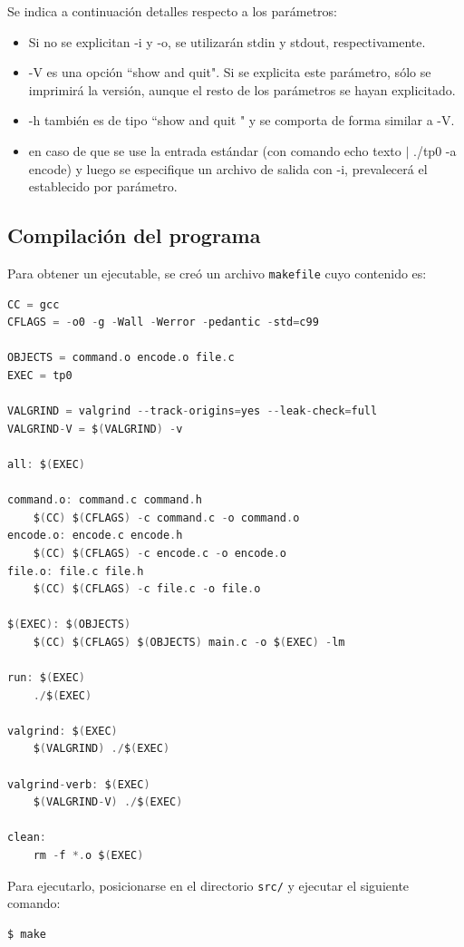 \documentclass[10pt,a4paper]{article}
\begin{document}
Se indica a continuación detalles respecto a los parámetros:

\begin{itemize}
    \item Si no se explicitan -i y -o, se utilizarán stdin y stdout, respectivamente. 
    \item -V es una opción ``show and quit". Si se explicita este parámetro, sólo se imprimirá la versión, aunque el resto de los parámetros se hayan explicitado. 
    \item -h también es de tipo ``show and quit " y se comporta de forma similar a -V.
    \item en caso de que se use la entrada estándar (con comando echo texto $|$ ./tp0 -a encode) y luego se especifique un archivo de salida con -i, prevalecerá el establecido por parámetro.
\end{itemize}

\subsection{Compilación del programa}

Para obtener un ejecutable, se creó un archivo \texttt{makefile} cuyo contenido es:
	\begin{lstlisting}[language=C]
CC = gcc
CFLAGS = -o0 -g -Wall -Werror -pedantic -std=c99

OBJECTS = command.o encode.o file.c
EXEC = tp0

VALGRIND = valgrind --track-origins=yes --leak-check=full
VALGRIND-V = $(VALGRIND) -v

all: $(EXEC)

command.o: command.c command.h
	$(CC) $(CFLAGS) -c command.c -o command.o
encode.o: encode.c encode.h
	$(CC) $(CFLAGS) -c encode.c -o encode.o
file.o: file.c file.h
	$(CC) $(CFLAGS) -c file.c -o file.o

$(EXEC): $(OBJECTS)
	$(CC) $(CFLAGS) $(OBJECTS) main.c -o $(EXEC) -lm

run: $(EXEC)
	./$(EXEC)

valgrind: $(EXEC)
	$(VALGRIND) ./$(EXEC)

valgrind-verb: $(EXEC)
	$(VALGRIND-V) ./$(EXEC)

clean:
	rm -f *.o $(EXEC)
	\end{lstlisting}


Para ejecutarlo, posicionarse en el directorio \texttt{src/} y ejecutar el siguiente comando:
\begin{lstlisting}
$ make
\end{lstlisting}
\end{document}
